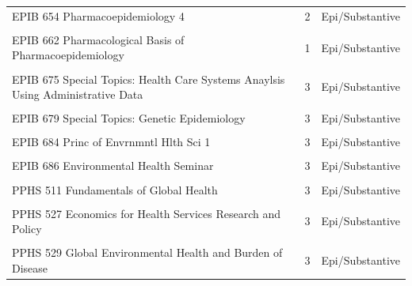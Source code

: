 \documentclass[
  openany]{book}
\begin{document}
\begin{table}
{\begin{tabular}[t]{l|r|l}
\hline
\cellcolor{gray!6}{EPIB 648 Methods in Social Epidemiology} & \cellcolor{gray!6}{3} & \cellcolor{gray!6}{Epi/Substantive}\\
\hline
EPIB 654 Pharmacoepidemiology 4 & 2 & Epi/Substantive\\
\hline
\cellcolor{gray!6}{EPIB 661 Pharmacoepidemiology 3} & \cellcolor{gray!6}{2} & \cellcolor{gray!6}{Epi/Substantive}\\
\hline
EPIB 662 Pharmacological Basis of Pharmacoepidemiology & 1 & Epi/Substantive\\
\hline
\cellcolor{gray!6}{EPIB 671 Cancer Epidemiology\&Prevention} & \cellcolor{gray!6}{2} & \cellcolor{gray!6}{Epi/Substantive}\\
\hline
EPIB 675 Special Topics: Health Care Systems Anaylsis Using Administrative Data & 3 & Epi/Substantive\\
\hline
\cellcolor{gray!6}{EPIB 676 Special Topics: Bayesian Analysis in the Health Sciences} & \cellcolor{gray!6}{3} & \cellcolor{gray!6}{Biostatistics}\\
\hline
EPIB 679 Special Topics: Genetic Epidemiology & 3 & Epi/Substantive\\
\hline
\cellcolor{gray!6}{EPIB 681 Global Health: Epid. Research} & \cellcolor{gray!6}{3} & \cellcolor{gray!6}{Epi/Substantive}\\
\hline
EPIB 684 Princ of Envrnmntl Hlth Sci 1 & 3 & Epi/Substantive\\
\hline
\cellcolor{gray!6}{EPIB 685 Princ of Envrnmntl Hlth Sci 2} & \cellcolor{gray!6}{3} & \cellcolor{gray!6}{Epi/Substantive}\\
\hline
EPIB 686 Environmental Health Seminar & 3 & Epi/Substantive\\
\hline
\cellcolor{gray!6}{PPHS 501 Population Health and Epidemiology} & \cellcolor{gray!6}{3} & \cellcolor{gray!6}{Epi/Substantive}\\
\hline
PPHS 511 Fundamentals of Global Health & 3 & Epi/Substantive\\
\hline
\cellcolor{gray!6}{PPHS 525 Healthcare Systems in Comparative Perspective} & \cellcolor{gray!6}{3} & \cellcolor{gray!6}{Epi/Substantive}\\
\hline
PPHS 527 Economics for Health Services Research and Policy & 3 & Epi/Substantive\\
\hline
\cellcolor{gray!6}{PPHS 528 Economic Evaluation of Health Programs} & \cellcolor{gray!6}{3} & \cellcolor{gray!6}{Epi/Substantive}\\
\hline
PPHS 529 Global Environmental Health and Burden of Disease & 3 & Epi/Substantive\\

\end{tabular}}
\end{table}
\end{document}
